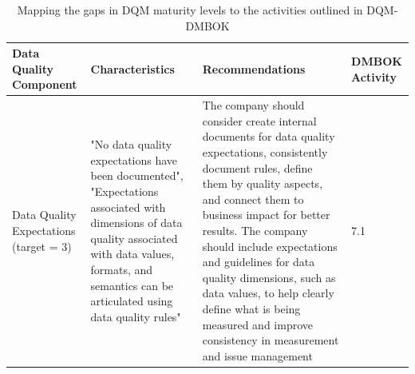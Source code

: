 \documentclass[conference]{IEEEtran}
\begin{document}
\begin{table}[h]
\caption{Mapping the gaps in DQM maturity levels to the activities outlined in DQM-DMBOK}
\label{tab:mapping}
\centering
\begin{tabular}{|p{2cm}|p{5cm}|p{5cm}|p{2cm}|}
\hline
\textbf{Data Quality Component} & \textbf{Characteristics} & \textbf{Recommendations} & \textbf{DMBOK Activity} \\
\hline
Data Quality Expectations (target = 3) & "No data quality expectations have been documented", "Expectations associated with dimensions of data quality associated with data values, formats, and semantics can be articulated using data quality rules" & The company should consider create internal documents for data quality expectations, consistently document rules, define them by quality aspects, and connect them to business impact for better results. The company should include expectations and guidelines for data quality dimensions, such as data values, to help clearly define what is being measured and improve consistency in measurement and issue management & 7.1 \\


\end{tabular}
\end{table}
\end{document}
